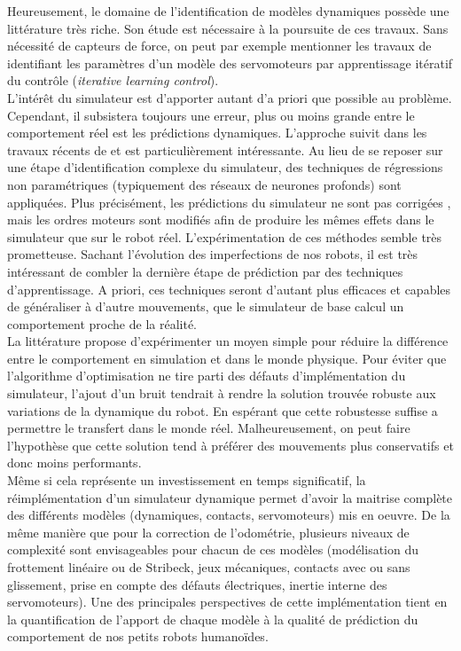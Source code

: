 Heureusement, le domaine de l'identification de modèles 
dynamiques possède une littérature très riche.
Son étude est nécessaire à la poursuite de ces travaux.
Sans nécessité de capteurs de force, on peut par exemple
mentionner les travaux de \cite{schwarz_compliant_2013} identifiant
les paramètres d'un modèle des servomoteurs par apprentissage itératif
du contrôle (\textit{iterative learning control}).\\

L'intérêt du simulateur est d'apporter autant d'a priori que possible 
au problème. Cependant, il subsistera toujours une erreur, 
plus ou moins grande entre le comportement réel est les prédictions dynamiques.
L'approche suivit dans les travaux récents de \cite{hanna_grounded_2017} 
et \cite{farchy_humanoid_2013} est particulièrement intéressante.
Au lieu de se reposer sur une étape d'identification complexe du simulateur,
des techniques de régressions non paramétriques (typiquement des réseaux de neurones profonds)
sont appliquées.
Plus précisément, les prédictions du simulateur ne sont pas \og corrigées \fg,
mais les ordres moteurs sont modifiés afin de produire les mêmes effets 
dans le simulateur que sur le robot réel.
L'expérimentation de ces méthodes semble très prometteuse.
Sachant l'évolution des imperfections de nos robots, il est très intéressant de combler 
la dernière étape de prédiction par des techniques d'apprentissage.
A priori, ces techniques seront d'autant plus efficaces et capables de 
généraliser à d'autre mouvements, que le simulateur de base 
calcul un comportement proche de la réalité.\\

La littérature propose d'expérimenter un moyen simple pour
réduire la différence entre le comportement en simulation et dans le
monde physique. Pour éviter que l'algorithme d'optimisation ne tire parti
des défauts d'implémentation du simulateur, l'ajout d'un bruit
tendrait à rendre la solution trouvée robuste aux variations de la dynamique du robot. 
En espérant que cette robustesse suffise a permettre le transfert dans le monde réel. 
Malheureusement, on peut faire l'hypothèse que cette solution tend à préférer 
des mouvements plus \og conservatifs \fg et donc moins performants.\\

Même si cela représente un investissement en temps significatif, 
la réimplémentation d'un simulateur dynamique permet d'avoir la maitrise complète 
des différents modèles (dynamiques, contacts, servomoteurs) mis en oeuvre.
De la même manière que pour la correction de l'odométrie, 
plusieurs niveaux de complexité sont envisageables pour chacun de ces modèles
(modélisation du frottement linéaire ou de Stribeck, jeux mécaniques, contacts avec
ou sans glissement, prise en compte des défauts électriques, inertie interne des servomoteurs).
Une des principales perspectives de cette implémentation tient en 
la quantification de l'apport de chaque modèle à la qualité de prédiction 
du comportement de nos petits robots humanoïdes.\\

